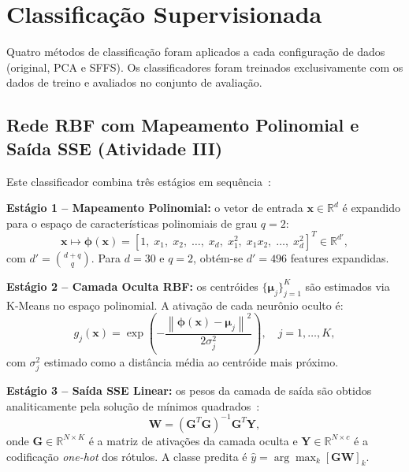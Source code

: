 \documentclass[12pt, a4paper]{article}
\newcommand{\bx}{\mathbf{x}}
\newcommand{\bmu}{\boldsymbol{\mu}}
\newcommand{\bW}{\mathbf{W}}
\newcommand{\bG}{\mathbf{G}}
\newcommand{\bY}{\mathbf{Y}}
\newcommand{\norm}[1]{\left\lVert#1\right\rVert}
\begin{document}
\section{Classificação Supervisionada}
\label{sec:classificacao}

Quatro métodos de classificação foram aplicados a cada configuração de dados (original, PCA e SFFS). Os classificadores foram treinados exclusivamente com os dados de treino e avaliados no conjunto de avaliação.

\subsection{Rede RBF com Mapeamento Polinomial e Saída SSE (Atividade III)}
\label{sec:polyrbf}

Este classificador combina três estágios em sequência~\cite{negri2021}:

\textbf{Estágio 1 -- Mapeamento Polinomial:} o vetor de entrada $\bx \in \mathbb{R}^d$ é expandido para o espaço de características polinomiais de grau $q=2$:
\begin{equation}
    \bx \mapsto \boldsymbol{\phi}(\bx) = [1,\; x_1,\; x_2,\; \ldots,\; x_d,\; x_1^2,\; x_1 x_2,\; \ldots,\; x_d^2]^T \in \mathbb{R}^{d'},
    \label{eq:poly}
\end{equation}
com $d' = \binom{d+q}{q}$. Para $d=30$ e $q=2$, obtém-se $d' = 496$ features expandidas.

\textbf{Estágio 2 -- Camada Oculta RBF:} os centróides $\{\bmu_j\}_{j=1}^{K}$ são estimados via K-Means no espaço polinomial. A ativação de cada neurônio oculto é:
\begin{equation}
    g_j(\bx) = \exp\!\left(-\frac{\norm{\boldsymbol{\phi}(\bx) - \bmu_j}^2}{2\sigma_j^2}\right), \quad j = 1, \ldots, K,
    \label{eq:rbf_act}
\end{equation}
com $\sigma_j^2$ estimado como a distância média ao centróide mais próximo.

\textbf{Estágio 3 -- Saída SSE Linear:} os pesos da camada de saída são obtidos analiticamente pela solução de mínimos quadrados~\cite{negri2021}:
\begin{equation}
    \bW = (\bG^T \bG)^{-1} \bG^T \bY,
    \label{eq:sse}
\end{equation}
onde $\bG \in \mathbb{R}^{N \times K}$ é a matriz de ativações da camada oculta e $\bY \in \mathbb{R}^{N \times c}$ é a codificação \emph{one-hot} dos rótulos. A classe predita é $\hat{y} = \arg\max_k [\bG \bW]_k$.
\end{document}
